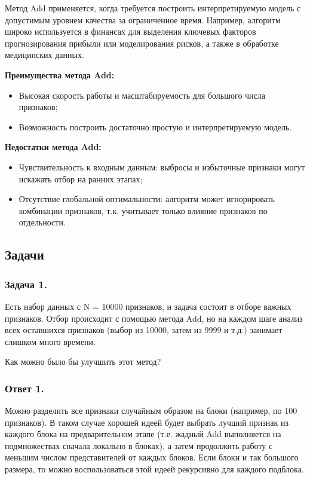 Метод Add применяется, когда требуется построить интерпретируемую модель с допустимым уровнем качества за ограниченное время. Например, алгоритм широко используется в финансах для выделения ключевых факторов прогнозирования прибыли или моделирования рисков, а также в обработке медицинских данных. 

\textbf{Преимущества метода Add:}
\begin{itemize}
    \item Высокая скорость работы и масштабируемость для большого числа признаков;
    \item Возможность построить достаточно простую и интерпретируемую модель.
\end{itemize}

\textbf{Недостатки метода Add:}
\begin{itemize}
    \item Чувствительность к входным данным: выбросы и избыточные признаки могут искажать отбор на ранних этапах;
    \item Отсутствие глобальной оптимальности: алгоритм может игнорировать комбинации признаков, т.к. учитывает только влияние признаков по отдельности.
\end{itemize}

\subsection{Задачи}

\subsubsection{Задача 1.}

Есть набор данных с N = 10000 признаков, и задача состоит в отборе важных признаков. Отбор происходит с помощью метода Add, но на каждом шаге анализ всех оставшихся признаков (выбор из 10000, затем из 9999 и т.д.) занимает слишком много времени.

Как можно было бы улучшить этот метод?

\subsubsection{Ответ 1.}

Можно разделить все признаки случайным образом на блоки (например, по 100 признаков). В таком случае хорошей идеей будет выбрать лучший признак из каждого блока на предварительном этапе (т.е. жадный Add выполняется на подмножествах сначала локально в блоках), а затем продолжить работу с меньшим числом представителей от каждых блоков. Если блоки и так большого размера, то можно воспользоваться этой идеей рекурсивно для каждого подблока.

